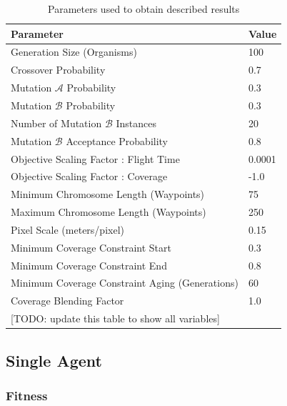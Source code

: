 \documentclass[letterpaper, 10 pt, conference]{ieeeconf}  %
\newcommand{\todo}[1]{{\color{blue}[TODO: #1]}}
\begin{document}
\begin{table}
  \caption{Parameters used to obtain described results}
\begin{tabular}{l|l}
\hline
\multicolumn{1}{|l|}{Parameter}                 & \multicolumn{1}{l|}{Value} \\ \hline
Generation Size (Organisms)                     & 100                        \\
Crossover Probability                           & 0.7                        \\
Mutation $\mathcal{A}$ Probability              & 0.3                        \\
Mutation $\mathcal{B}$ Probability              & 0.3                        \\
Number of Mutation $\mathcal{B}$ Instances      & 20                         \\
Mutation $\mathcal{B}$ Acceptance Probability   & 0.8                        \\
Objective Scaling Factor : Flight Time          & 0.0001                     \\
Objective Scaling Factor : Coverage             & -1.0                       \\
Minimum Chromosome Length (Waypoints)           & 75                         \\
Maximum Chromosome Length (Waypoints)           & 250                        \\
Pixel Scale (meters/pixel)                      & 0.15                       \\
Minimum Coverage Constraint Start               & 0.3                        \\
Minimum Coverage Constraint End                 & 0.8                        \\
Minimum Coverage Constraint Aging (Generations) & 60                         \\
Coverage Blending Factor                        & 1.0                        \\
\todo{update this table to show all variables}\\
\end{tabular}
\label{tab:parameters}
\end{table}

\subsection{Single Agent}
\subsubsection{Fitness}
\end{document}
